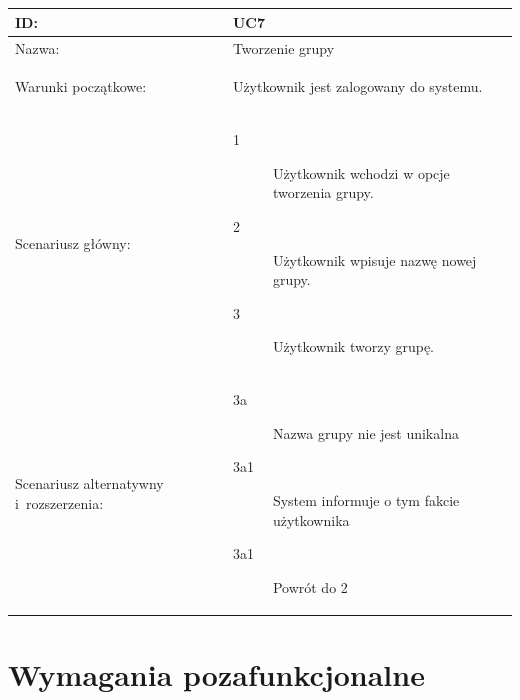 \documentclass[11pt,a4paper,polish,thesis]{dcsbook}
\begin{document}
\\\\ \begin{tabular}{|p{2.5cm}|p{11.5cm}|}  \hline ID: &
UC7
\\ \hline Nazwa: &
Tworzenie grupy
\\ \hline Warunki początkowe: &
\begin{description}
\item Użytkownik jest zalogowany do systemu.
\end{description}
\\ \hline Scenariusz główny: &
\begin{description}
\item[1] Użytkownik wchodzi w opcje tworzenia grupy.
\item[2] Użytkownik wpisuje nazwę nowej grupy.
\item[3] Użytkownik tworzy grupę.
\end{description}
\\ \hline Scenariusz alternatywny i~rozszerzenia: &
\begin{description}
\item[3a] Nazwa grupy nie jest unikalna
\item[3a1] System informuje o tym fakcie użytkownika
\item[3a1] Powrót do 2
\end{description}
\\ \hline \end{tabular}
\section{Wymagania pozafunkcjonalne}
\end{document}
